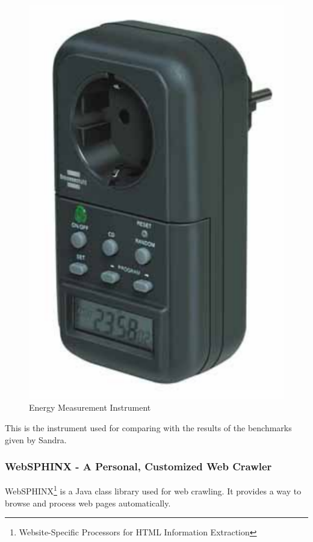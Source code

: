     \begin{figure}[!h]
        \centering
            \includegraphics[scale=0.6]{graphics/energy_measurement_instrument}
            \caption{Energy Measurement Instrument}
            \label{fig:energy_measurement_instrument}
    \end{figure}
This is the instrument used for comparing with the results of the benchmarks given by Sandra. 

\subsubsection{WebSPHINX - A Personal, Customized Web Crawler} \label{sec3:websphinx}
    WebSPHINX\footnote{Website-Specific Processors for HTML Information Extraction} is a Java class library used for web crawling. It provides a way to browse and process web pages automatically.
    
